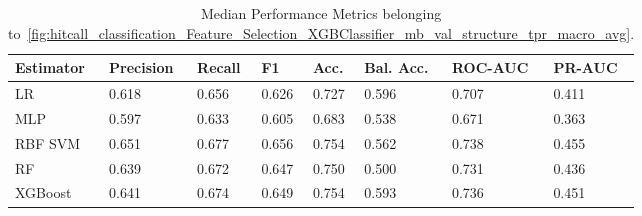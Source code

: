 \begin{longtable}{llllllll}
\caption{Median Performance Metrics belonging to~\ref{fig:hitcall_classification_Feature_Selection_XGBClassifier_mb_val_structure_tpr_macro_avg}.}\label{tab:table:hitcall_classification_feature_selection_xgbclassifier_mb_val_structure_tpr_macro_avg}\\
\toprule
\midrule
\small Estimator & \small Precision & \small Recall & \small F1 & \small Acc. & \small Bal. Acc. & \small ROC-AUC & \small PR-AUC\\
\hline
LR & 0.618 & 0.656 & 0.626 & 0.727 & 0.596 & 0.707 & 0.411\\
MLP & 0.597 & 0.633 & 0.605 & 0.683 & 0.538 & 0.671 & 0.363\\
RBF SVM & 0.651 & 0.677 & 0.656 & 0.754 & 0.562 & 0.738 & 0.455\\
RF & 0.639 & 0.672 & 0.647 & 0.750 & 0.500 & 0.731 & 0.436\\
XGBoost & 0.641 & 0.674 & 0.649 & 0.754 & 0.593 & 0.736 & 0.451\\
\bottomrule
\end{longtable}